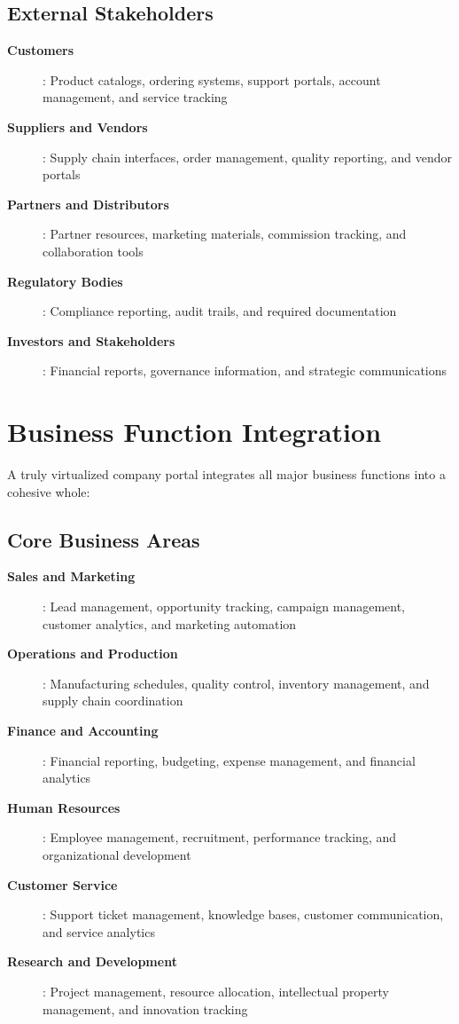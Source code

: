 \subsection{External Stakeholders}

\begin{description}
\item[\textbf{Customers}]: Product catalogs, ordering systems, support portals, account management, and service tracking
\item[\textbf{Suppliers and Vendors}]: Supply chain interfaces, order management, quality reporting, and vendor portals
\item[\textbf{Partners and Distributors}]: Partner resources, marketing materials, commission tracking, and collaboration tools
\item[\textbf{Regulatory Bodies}]: Compliance reporting, audit trails, and required documentation
\item[\textbf{Investors and Stakeholders}]: Financial reports, governance information, and strategic communications
\end{description}

\section{Business Function Integration}
\label{sec:business-integration}

A truly virtualized company portal integrates all major business functions into a cohesive whole:

\subsection{Core Business Areas}

\begin{description}
\item[\textbf{Sales and Marketing}]: Lead management, opportunity tracking, campaign management, customer analytics, and marketing automation
\item[\textbf{Operations and Production}]: Manufacturing schedules, quality control, inventory management, and supply chain coordination
\item[\textbf{Finance and Accounting}]: Financial reporting, budgeting, expense management, and financial analytics
\item[\textbf{Human Resources}]: Employee management, recruitment, performance tracking, and organizational development
\item[\textbf{Customer Service}]: Support ticket management, knowledge bases, customer communication, and service analytics
\item[\textbf{Research and Development}]: Project management, resource allocation, intellectual property management, and innovation tracking
\end{description}

